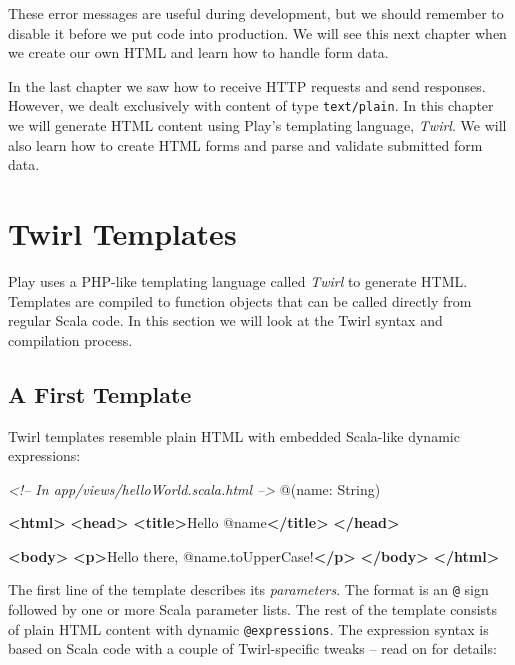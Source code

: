 \documentclass[oneside,11pt,a4paper,]{book}
\newenvironment{Shaded}{\begin{snugshade}}{\end{snugshade}}
\newcommand{\KeywordTok}[1]{\textcolor[rgb]{0.13,0.29,0.53}{\textbf{{#1}}}}
\newcommand{\CommentTok}[1]{\textcolor[rgb]{0.56,0.35,0.01}{\textit{{#1}}}}
\newcommand{\NormalTok}[1]{{#1}}
\begin{document}
These error messages are useful during development, but we should
remember to disable it before we put code into production. We will see
this next chapter when we create our own HTML and learn how to handle
form data.


In the last chapter we saw how to receive HTTP requests and send
responses. However, we dealt exclusively with content of type
\texttt{text/plain}. In this chapter we will generate HTML content using
Play's templating language, \emph{Twirl}. We will also learn how to
create HTML forms and parse and validate submitted form data.

\section{Twirl Templates}\label{twirl-templates}

Play uses a PHP-like templating language called \emph{Twirl} to generate
HTML. Templates are compiled to function objects that can be called
directly from regular Scala code. In this section we will look at the
Twirl syntax and compilation process.

\subsection{A First Template}\label{a-first-template}

Twirl templates resemble plain HTML with embedded Scala-like dynamic
expressions:

\begin{Shaded}
\begin{Highlighting}[]
\CommentTok{<!-- In app/views/helloWorld.scala.html -->}
\NormalTok{@(name: String)}

\KeywordTok{<html>}
  \KeywordTok{<head>}
    \KeywordTok{<title>}\NormalTok{Hello @name}\KeywordTok{</title>}
  \KeywordTok{</head>}

  \KeywordTok{<body>}
    \KeywordTok{<p>}\NormalTok{Hello there, @name.toUpperCase!}\KeywordTok{</p>}
  \KeywordTok{</body>}
\KeywordTok{</html>}
\end{Highlighting}
\end{Shaded}

The first line of the template describes its \emph{parameters}. The
format is an \texttt{@} sign followed by one or more Scala parameter
lists. The rest of the template consists of plain HTML content with
dynamic \texttt{@expressions}. The expression syntax is based on Scala
code with a couple of Twirl-specific tweaks -- read on for details:
\end{document}
